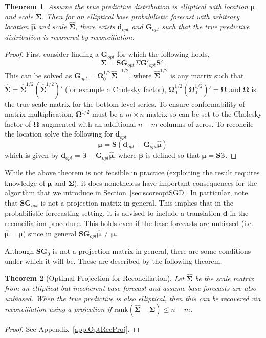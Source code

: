 \documentclass[12pt]{article}
\newtheorem{theo}{Theorem}[section]
\theoremstyle{definition}
\begin{document}
\begin{theo}\label{theo:OptRec}
	Assume the true predictive distribution is elliptical with location ${\bm\mu}$ and scale ${\bm\Sigma}$.  Then for an elliptical base probabilistic forecast with arbitrary location $\hat{\bm\mu}$ and scale $\hat{\bm\Sigma}$, there exists $\bm{d}_{opt}$ and $\bm{G}_{opt}$ such that the true predictive distribution is recovered by reconciliation. 
\end{theo}
\begin{proof}
	First consider finding a $\bm{G}_{opt}$ for which the following holds, 
	\begin{equation*}
	\bm{\Sigma}=\bm{S}\bm{G}_{opt}\Sigma\bm{G}'_{opt}\bm{S}'\,.
	\end{equation*}
	This can be solved as $\bm{G}_{opt}={\bm{\Omega}}_0^{1/2}\hat{\bm \Sigma}^{-1/2}$, where $\hat{\bm \Sigma}^{1/2}$ is any matrix such that $\hat{\bm \Sigma}=\hat{\bm \Sigma}^{1/2}(\hat{\bm \Sigma}^{1/2})'$ (for example a Cholesky factor), ${\bm{\Omega}}_0^{1/2}({\bm{\Omega}}_0^{1/2})'={\bm\Omega}$ and ${\bm\Omega}$ is the true scale matrix for the bottom-level series. To ensure conformability of matrix multiplication, ${\bm{\Omega}}^{1/2}$ must be a $m\times n$ matrix so can be set to the Cholesky factor of ${\bm{\Omega}}$ augmented with an additional $n-m$ columns of zeros. To reconcile the location solve the following for $\bm{d}_{opt}$
	\begin{equation*}
	\bm{\mu}=\bm{S}(\bm{d}_{opt}+\bm{G}_{opt}\hat{\bm{\mu}})\,
	\end{equation*}
	which is given by $\bm{d}_{opt}=\bm{\beta}-\bm{G}_{opt}\hat{\bm\mu}$, where $\bm{\beta}$ is defined so that $\bm{\mu}=\bm{S}\bm{\beta}$. 
\end{proof}

While the above theorem is not feasible in practice (exploiting the result requires knowledge of $\bm{\mu}$ and $\bm{\Sigma}$), it does nonetheless have important consequences for the algorithm that we introduce in Section~\ref{sec:scoreoptSGD}. In particular, note that ${\bm S}{\bm G}_{opt}$ is not a projection matrix in general.  This implies that in the probabilistic forecasting setting, it is advised to include a translation $\bm{d}$ in the reconciliation procedure.  This holds even if the base forecasts are unbiased (i.e. $\hat{\bm{\mu}}=\bm{\mu}$) since in general ${\bm S}{\bm G}_{opt}\hat{\bm{\mu}}\neq\bm{\mu}$.  

Although ${\bm S}{\bm G}_0$ is not a projection matrix in general, there are some conditions under which it will be.  These are described by the following theorem.
\begin{theo}[Optimal Projection for Reconciliation]\label{theo:OptRecProj}
	Let $\hat{\bm{\Sigma}}$ be the scale matrix from an elliptical but incoherent base forecast and assume base forecasts are also unbiased.  When the true predictive is also elliptical, then this can be recovered via reconciliation using a projection if $\textrm{rank}(\hat{\bm{\Sigma}}-\bm{\Sigma})\leq n-m$.
\end{theo}
\begin{proof}
	See Appendix~\ref{app:OptRecProj}.
\end{proof}
\end{document}
